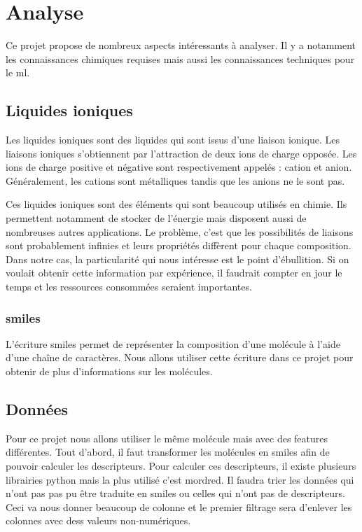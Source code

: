\chapter{Analyse}
\label{chap:analyse}
Ce projet propose de nombreux aspects intéressants à analyser.
Il y a notamment les connaissances chimiques requises mais aussi les connaissances techniques pour le \acrlong{ml}.

\section{Liquides ioniques}
Les liquides ioniques sont des liquides qui sont issus d'une liaison ionique.
Les liaisons ioniques s'obtiennent par l'attraction de deux ions de charge opposée.
Les ions de charge positive et négative sont respectivement appelés : cation et anion.
Généralement, les cations sont métalliques tandis que les anions ne le sont pas.

Ces liquides ioniques sont des éléments qui sont beaucoup utilisés en chimie.
Ils permettent notamment de stocker de l'énergie mais disposent aussi de nombreuses autres applications.
Le problème, c'est que les possibilités de liaisons sont probablement infinies et leurs propriétés diffèrent pour chaque composition.
Dans notre cas, la particularité qui nous intéresse est le point d'ébullition.
Si on voulait obtenir cette information par expérience, il faudrait compter en jour le temps et les ressources consommées seraient importantes.

\subsection{\acrshort{smiles}}
L'écriture \acrfull{smiles} permet de représenter la composition d'une molécule à l'aide d'une chaîne de caractères.
Nous allons utiliser cette écriture dans ce projet pour obtenir de plus d'informations sur les molécules.


\section{Données}
Pour ce projet nous allons utiliser le même molécule mais avec des features différentes.
Tout d'abord, il faut transformer les molécules en \acrshort{smiles} afin de pouvoir calculer les descripteurs.
Pour calculer ces descripteurs, il existe plusieurs librairies python mais la plus utilisé c'est mordred\cite{mordred}.
Il faudra trier les données qui n'ont pas pas pu être traduite en \acrshort{smiles} ou celles qui n'ont pas de descripteurs.
Ceci va nous donner beaucoup de colonne et le premier filtrage sera d'enlever les colonnes avec dess valeurs non-numériques.

